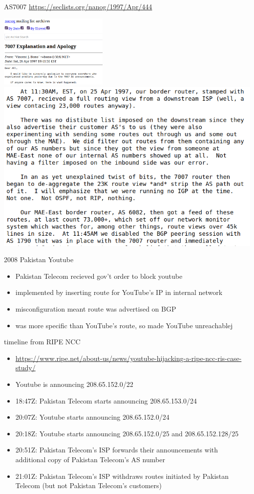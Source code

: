 
\begin{frame}{AS7007}
{\fontsize{8}{9}\selectfont\url{https://seclists.org/nanog/1997/Apr/444}}

\includegraphics[width=0.4\textwidth]{as7007-1.png}
\includegraphics[height=0.4\textwidth]{as7007-2.png}
\end{frame}

\begin{frame}{2008 Pakistan Youtube}
\begin{itemize}
\item Pakistan Telecom recieved gov't order to block youtube
\item implemented by inserting route for YouTube's IP in internal network
\vspace{.5cm}
\item misconfiguration meant route was advertised on BGP
\item was more specific than YouTube's route, so made YouTube unreachablej
\end{itemize}
\end{frame}

\begin{frame}{timeline from RIPE NCC}
\begin{itemize}
\item {\tiny \url{https://www.ripe.net/about-us/news/youtube-hijacking-a-ripe-ncc-ris-case-study/}}
\item Youtube is announcing 208.65.152.0/22
\item 18:47Z: Pakistan Telecom starts announcing 208.65.153.0/24
\item 20:07Z: Youtube starts announcing 208.65.152.0/24
\item 20:18Z: Youtube starts announcing 208.65.152.0/25 and 208.65.152.128/25
\item 20:51Z: Pakistan Telecom's ISP forwards their announcements with additional copy of Pakistan Telecom's AS number
\item 21:01Z: Pakistan Telecom's ISP withdraws routes initiated by Pakistan Telecom (but not Pakistan Telecom's customers)
\end{itemize}
\end{frame}

